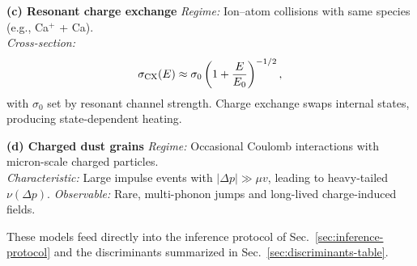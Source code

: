 \medskip
\noindent\textbf{(c) Resonant charge exchange}\quad
\emph{Regime:} Ion--atom collisions with same species (e.g., Ca$^+$ + Ca).\\
\emph{Cross-section:}
\[
\sigma_{\rm CX}(E) \approx \sigma_0\left(1 + \frac{E}{E_0}\right)^{-1/2},
\]
with $\sigma_0$ set by resonant channel strength.
Charge exchange swaps internal states, producing state-dependent heating.

\medskip
\noindent\textbf{(d) Charged dust grains}\quad
\emph{Regime:} Occasional Coulomb interactions with micron-scale charged particles.\\
\emph{Characteristic:} Large impulse events with $|\Delta p| \gg \mu v$, leading to heavy-tailed $\nu(\Delta p)$.
\emph{Observable:} Rare, multi-phonon jumps and long-lived charge-induced fields.

These models feed directly into the inference protocol of Sec.~\ref{sec:inference-protocol} and the discriminants summarized in Sec.~\ref{sec:discriminants-table}.
